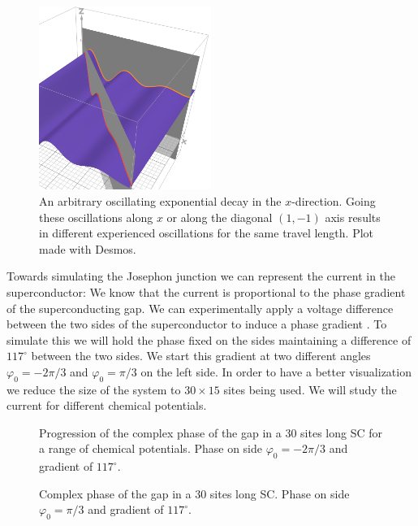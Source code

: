\documentclass[..\main.tex]{subfile}
\begin{document}
\begin{figure}[H]
  \centering
  \includegraphics[width=0.5\textwidth]{Ressources/CooperPairsOrient.PNG}
  \caption{An arbitrary oscillating exponential decay in the $x$-direction. Going these oscillations along $x$ or along the diagonal $(1,-1)$ axis results in different
  experienced oscillations for the same travel length. Plot made with Desmos.}
\end{figure}
Towards simulating the Josephon junction we can represent the current in the superconductor:  
We know  that the current is proportional to the phase gradient of the superconducting gap.
We can experimentally apply a voltage difference between the two sides of the superconductor to induce a phase gradient .
To simulate this we will hold the phase fixed on the sides maintaining a difference of $117^{\circ}$ between the two sides.
We start this gradient at two different angles $\varphi_0 = -2\pi/3$ and $\varphi_0 = \pi/3$ on the left side.
In order to have a better visualization we reduce the size of the system to $30\times15$ sites being used.
 We will study the current for different chemical potentials.
\begin{figure}[H]
    
    \caption{Progression of the complex phase of the gap in a 30 sites long SC for a range of chemical potentials.
     Phase on side $\varphi_0 = -2\pi/3$ and gradient of $117^{\circ}$.}
    \label{fig:Phase-2pi3}
\end{figure}
\begin{figure}[H]
    
    \caption{Complex phase of the gap in a 30 sites long SC. Phase on side $\varphi_0 = \pi/3$ and gradient of $117^{\circ}$.}
    \label{fig:Phasepi3}
\end{figure}
\end{document}
